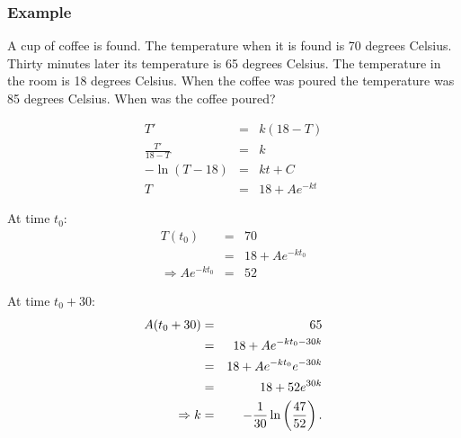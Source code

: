 \begin{frame}
  \frametitle{Example}

  A cup of coffee is found. {\color{red}The temperature when it is found is 70
  degrees Celsius.} {\color{blue}Thirty minutes later its temperature is 65 degrees
  Celsius.} {\color{purple}The temperature in the room is 18 degrees Celsius.} 
  {\color{orange}When the coffee was poured the temperature was 85 degrees Celsius.} 
  When was the coffee poured?


\end{frame}


\begin{frame}

  \begin{eqnarray*}
    T' & = & k(18-T) \\
    \frac{T'}{18-T} & = & k \\
    -\ln(T-18) & = & kt + C \\
    T & = & 18 + A e^{-kt} 
  \end{eqnarray*}

\end{frame}

\begin{frame}

  At time $t_0$:
  \begin{eqnarray*}
    T(t_0) & = & 70 \\
    & = & 18 + Ae^{-kt_0} \\
    \Rightarrow Ae^{-kt_0} & = & 52
  \end{eqnarray*}

  At time $t_0+30$:
  \begin{eqnarray*}
    A(t_0+30) & = & 65 \\
    & = & 18 + A e^{-kt_0-30k} \\
    & = & 18 + A e^{-kt_0} e^{-30k} \\
    & = & 18 + 52 e^{30k} \\
    \Rightarrow k & = & -\frac{1}{30} \ln\left(\frac{47}{52}\right).
  \end{eqnarray*}

\end{frame}



